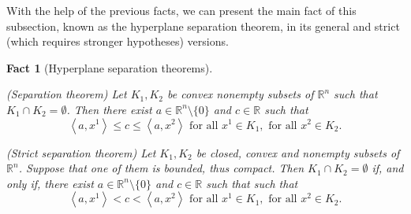 \documentclass[smallextended,numbook,nospthms]{svjour3}
\theoremstyle{plain}
\newtheorem{fact}[theorem]{Fact}
\theoremstyle{definition}
\def\RR{\mathds R}
\newcommand{\scal}[2]{\left\langle{#1},{#2}  \right\rangle}
\begin{document}
With the help of the previous facts, we can present the main fact of this subsection, known as the hyperplane separation theorem, in its general and strict (which requires stronger hypotheses) versions.
\begin{fact}[Hyperplane separation theorems]\label{fact:hyperplane sep}
	\begin{listi}
		\item (Separation theorem) Let $K_1, K_2$ be convex nonempty subsets of $\RR^n$ such that $K_1 \cap K_2 = \emptyset$. Then there exist $a \in \RR^n \setminus \{0\}$ and $c \in \RR$ such that
		\[
		\scal{a}{x^1} \leq c \leq \scal{a}{x^2} \text{ for all } x^1 \in K_1, \text{ for all } x^2 \in K_2.
		\]
		\item (Strict separation theorem) Let $K_1, K_2$ be closed, convex and nonempty subsets of $\RR^n$. Suppose that one of them is bounded, thus compact. Then $K_1 \cap K_2 = \emptyset$ if, and only if, there exist $a \in \RR^n \setminus \{0\}$ and $c \in \RR$ such that such that
		\[
		\scal{a}{x^1} < c < \scal{a}{x^2} \text{ for all } x^1 \in K_1, \text{ for all } x^2 \in K_2.
		\]
	\end{listi}
\end{fact}
\end{document}
